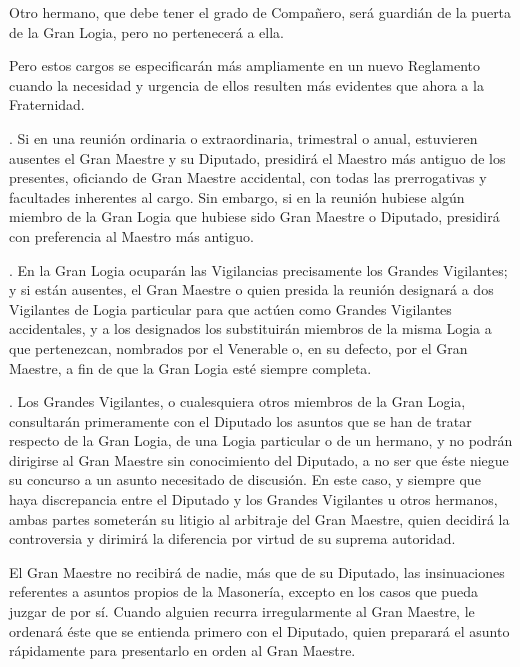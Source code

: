 \documentclass[a4paper,12pt,twoside]{book}
\begin{document}
\noindent Otro hermano, que debe tener el grado de Compañero, será guardián de la puerta de la Gran Logia, pero no pertenecerá a ella.

\noindent Pero estos cargos se especificarán más ampliamente en un nuevo Reglamento cuando la necesidad y urgencia de ellos resulten más evidentes que ahora a la Fraternidad.

\vspace{0.3cm}

. Si en una reunión ordinaria o extraordinaria, trimestral o anual, estuvieren ausentes el Gran Maestre y su Diputado, presidirá el Maestro más antiguo de los presentes, oficiando de Gran Maestre accidental, con todas las prerrogativas y facultades inherentes al cargo. Sin embargo, si en la reunión hubiese algún miembro de la Gran Logia que hubiese sido Gran Maestre o Diputado, presidirá con preferencia al Maestro más antiguo.

\vspace{0.3cm}

. En la Gran Logia ocuparán las Vigilancias precisamente los Grandes Vigilantes; y si están ausentes, el Gran Maestre o quien presida la reunión designará a dos Vigilantes de Logia particular para que actúen como Grandes Vigilantes accidentales, y a los designados los substituirán miembros de la misma Logia a que pertenezcan, nombrados por el Venerable o, en su defecto, por el Gran Maestre, a fin de que la Gran Logia esté siempre completa.

\vspace{0.3cm}

. Los Grandes Vigilantes, o cualesquiera otros miembros de la Gran Logia, consultarán primeramente con el Diputado los asuntos que se han de tratar respecto de la Gran Logia, de una Logia particular o de un hermano, y no podrán dirigirse al Gran Maestre sin conocimiento del Diputado, a no ser que éste niegue su concurso a un asunto necesitado de discusión. En este caso, y siempre que haya discrepancia entre el Diputado y los Grandes Vigilantes u otros hermanos, ambas partes someterán su litigio al arbitraje del Gran Maestre, quien decidirá la controversia y dirimirá la diferencia por virtud de su suprema autoridad.

\noindent El Gran Maestre no recibirá de nadie, más que de su Diputado, las insinuaciones referentes a asuntos propios de la Masonería, excepto en los casos que pueda juzgar de por sí. Cuando alguien recurra irregularmente al Gran Maestre, le ordenará éste que se entienda primero con el Diputado, quien preparará el asunto rápidamente para presentarlo en orden al Gran Maestre.
\end{document}

